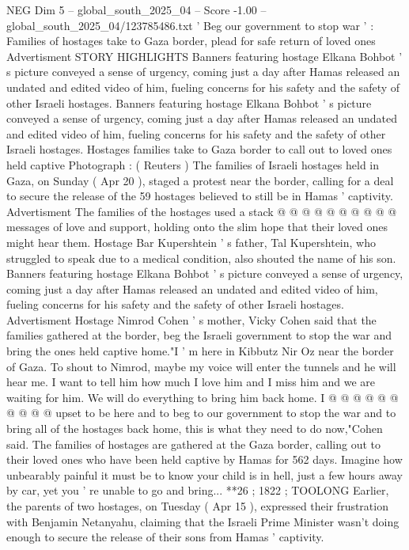 \begin{textsample}{NEG Dim 5 – global\_south\_2025\_04 – Score -1.00 – global\_south\_2025\_04/123785486.txt}  \label{ex:f5_neg_390}
' Beg our government to stop war ' : Families of hostages take to Gaza border, plead for safe return of loved ones Advertisment STORY HIGHLIGHTS Banners featuring hostage Elkana Bohbot ' s picture conveyed a sense of urgency, coming just a day after Hamas released an undated and edited video of him, fueling concerns for his safety and the safety of other Israeli hostages.
Banners featuring hostage Elkana Bohbot ' s picture conveyed a sense of urgency, coming just a day after Hamas released an undated and edited video of him, fueling concerns for his safety and the safety of other Israeli hostages.
Hostages families take to Gaza border to call out to loved ones held captive Photograph : ( Reuters ) The families of Israeli hostages held in Gaza, on Sunday ( Apr 20 ), staged a protest near the border, calling for a deal to secure the release of the 59 hostages believed to still be in Hamas ' captivity.
Advertisment The families of the hostages used a stack @ @ @ @ @ @ @ @ @ @ messages of love and support, holding onto the slim hope that their loved ones might hear them.
Hostage Bar Kupershtein ' s father, Tal Kupershtein, who struggled to speak due to a medical condition, also shouted the name of his son.
Banners featuring hostage Elkana Bohbot ' s picture conveyed a sense of urgency, coming just a day after Hamas released an undated and edited video of him, fueling concerns for his safety and the safety of other Israeli hostages.
Advertisment Hostage Nimrod Cohen ' s mother, Vicky Cohen said that the families gathered at the border, beg the Israeli government to stop the war and bring the ones held captive home."I ' m here in Kibbutz Nir Oz near the border of Gaza.
To shout to Nimrod, maybe my voice will enter the tunnels and he will hear me.
I want to tell him how much I love him and I miss him and we are waiting for him.
We will do everything to bring him back home.
I @ @ @ @ @ @ @ @ @ @ upset to be here and to beg to our government to stop the war and to bring all of the hostages back home, this is what they need to do now,"Cohen said.
The families of hostages are gathered at the Gaza border, calling out to their loved ones who have been held captive by Hamas for 562 days.
Imagine how unbearably painful it must be to know your child is in hell, just a few hours away by car, yet you ' re unable to go and bring... **26 ; 1822 ; TOOLONG Earlier, the parents of two hostages, on Tuesday ( Apr 15 ), expressed their frustration with Benjamin Netanyahu, claiming that the Israeli Prime Minister wasn't doing enough to secure the release of their sons from Hamas ' captivity.

\end{textsample}
